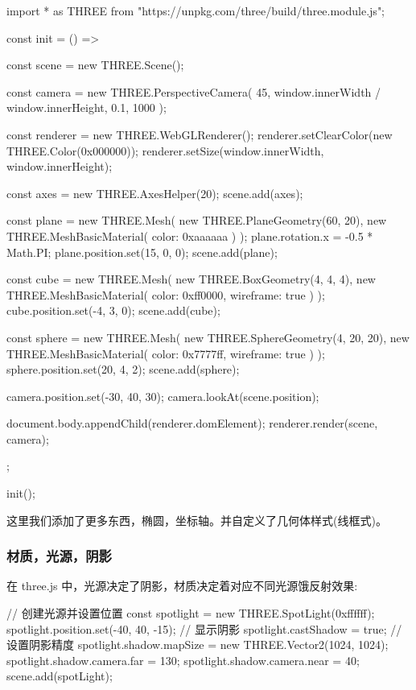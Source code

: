 \begin{JavaScript}
import * as THREE from "https://unpkg.com/three/build/three.module.js";

const init = () => {
  const scene = new THREE.Scene();

  const camera = new THREE.PerspectiveCamera(
    45,
    window.innerWidth / window.innerHeight,
    0.1,
    1000
  );

  const renderer = new THREE.WebGLRenderer();
  renderer.setClearColor(new THREE.Color(0x000000));
  renderer.setSize(window.innerWidth, window.innerHeight);

  const axes = new THREE.AxesHelper(20);
  scene.add(axes);

  const plane = new THREE.Mesh(
    new THREE.PlaneGeometry(60, 20),
    new THREE.MeshBasicMaterial({ color: 0xaaaaaa })
  );
  plane.rotation.x = -0.5 * Math.PI;
  plane.position.set(15, 0, 0);
  scene.add(plane);

  const cube = new THREE.Mesh(
    new THREE.BoxGeometry(4, 4, 4),
    new THREE.MeshBasicMaterial({ color: 0xff0000, wireframe: true })
  );
  cube.position.set(-4, 3, 0);
  scene.add(cube);

  const sphere = new THREE.Mesh(
    new THREE.SphereGeometry(4, 20, 20),
    new THREE.MeshBasicMaterial({ color: 0x7777ff, wireframe: true })
  );
  sphere.position.set(20, 4, 2);
  scene.add(sphere);

  camera.position.set(-30, 40, 30);
  camera.lookAt(scene.position);

  document.body.appendChild(renderer.domElement);
  renderer.render(scene, camera);
};

init();
\end{JavaScript}

这里我们添加了更多东西，椭圆，坐标轴。并自定义了几何体样式(线框式)。

\subsubsection{材质，光源，阴影}

在 three.js 中，光源决定了阴影，材质决定着对应不同光源饿反射效果:

\begin{JavaScript}
// 创建光源并设置位置
const spotlight = new THREE.SpotLight(0xffffff);
spotlight.position.set(-40, 40, -15);
// 显示阴影
spotlight.castShadow = true;
// 设置阴影精度
spotlight.shadow.mapSize = new THREE.Vector2(1024, 1024);
spotlight.shadow.camera.far = 130;
spotlight.shadow.camera.near = 40;
scene.add(spotLight);
\end{JavaScript}

